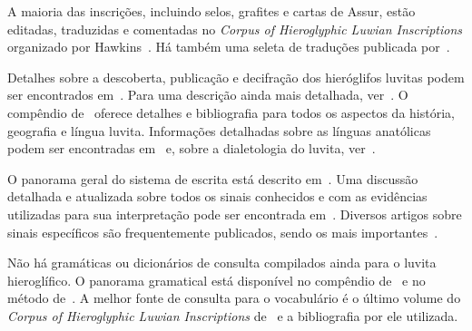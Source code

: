 \documentclass[article]{luvita}
\begin{document}
A maioria das inscrições, incluindo selos, grafites e cartas de Assur, estão
editadas, traduzidas e comentadas no \emph{Corpus of Hieroglyphic Luwian
	Inscriptions} organizado por Hawkins~\cite{CHLI11,CHLI12,CHLI13,CHLI2,CHLI3}.
Há também uma seleta de traduções publicada por~\citet{Payne2012}.

Detalhes sobre a descoberta, publicação e decifração dos hieróglifos luvitas
podem ser encontrados em~\citet[pp. 131ff.]{HawkinsScripts}. Para uma descrição
ainda mais detalhada, ver~\citet[pp. 6-17]{CHLI11}.
O compêndio de~\citet{Melchert2003} oferece detalhes e bibliografia para todos
os aspectos da história, geografia e língua luvita.
Informações detalhadas sobre as línguas anatólicas podem ser encontradas
em~\citet[239--308]{HSK41.1} e, sobre a dialetologia do luvita,
ver~\citet{Yakubovich2010}.

O panorama geral do sistema de escrita está descrito
em~\citet[p. 155ff.]{HawkinsScripts}.
Uma discussão detalhada e atualizada sobre todos os sinais conhecidos e com
as evidências utilizadas para sua interpretação pode ser encontrada
em~\citet[354--488]{CHLI3}.
Diversos artigos sobre sinais específicos são frequentemente publicados, sendo
os mais
importantes~\citet{HawkinsMorpurgoNeumann1974,Rieken2008,RiekenYakubovich2010}.

Não há gramáticas ou dicionários de consulta compilados ainda para o luvita
hieroglífico.
O panorama gramatical está disponível no compêndio de~\citet{Melchert2003} e no
método de~\citet{Payne2010}.
A melhor fonte de consulta para o vocabulário é o último volume do \emph{Corpus
	of Hieroglyphic Luwian Inscriptions} de~\citet{CHLI13} e a bibliografia por ele
utilizada.


\printbibliography%
\end{document}

